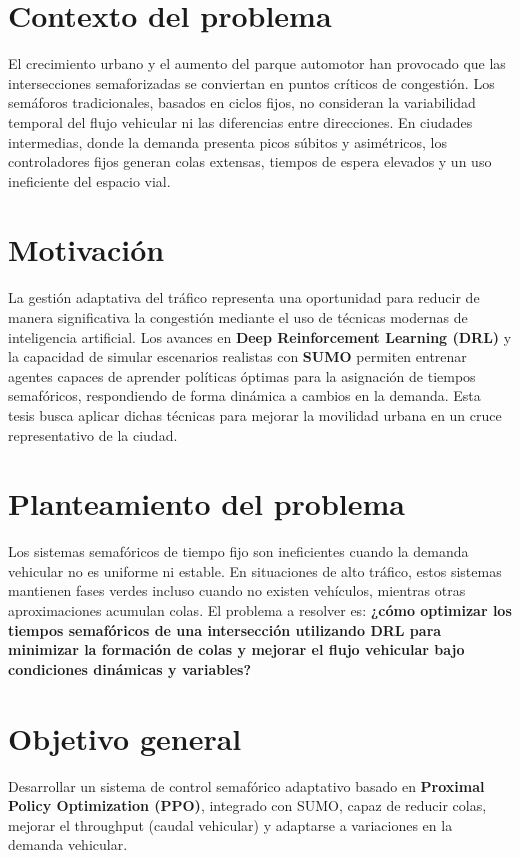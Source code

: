 \section{Contexto del problema}
El crecimiento urbano y el aumento del parque automotor han provocado que las intersecciones semaforizadas se conviertan en puntos críticos de congestión. Los semáforos tradicionales, basados en ciclos fijos, no consideran la variabilidad temporal del flujo vehicular ni las diferencias entre direcciones. En ciudades intermedias, donde la demanda presenta picos súbitos y asimétricos, los controladores fijos generan colas extensas, tiempos de espera elevados y un uso ineficiente del espacio vial.

\section{Motivación}
La gestión adaptativa del tráfico representa una oportunidad para reducir de manera significativa la congestión mediante el uso de técnicas modernas de inteligencia artificial. Los avances en \textbf{Deep Reinforcement Learning (DRL)} y la capacidad de simular escenarios realistas con \textbf{SUMO} permiten entrenar agentes capaces de aprender políticas óptimas para la asignación de tiempos semafóricos, respondiendo de forma dinámica a cambios en la demanda. Esta tesis busca aplicar dichas técnicas para mejorar la movilidad urbana en un cruce representativo de la ciudad.

\section{Planteamiento del problema}
Los sistemas semafóricos de tiempo fijo son ineficientes cuando la demanda vehicular no es uniforme ni estable. En situaciones de alto tráfico, estos sistemas mantienen fases verdes incluso cuando no existen vehículos, mientras otras aproximaciones acumulan colas. El problema a resolver es: \textbf{¿cómo optimizar los tiempos semafóricos de una intersección utilizando DRL para minimizar la formación de colas y mejorar el flujo vehicular bajo condiciones dinámicas y variables?}

\section{Objetivo general}
Desarrollar un sistema de control semafórico adaptativo basado en \textbf{Proximal Policy Optimization (PPO)}, integrado con SUMO, capaz de reducir colas, mejorar el throughput (caudal vehicular) y adaptarse a variaciones en la demanda vehicular.

